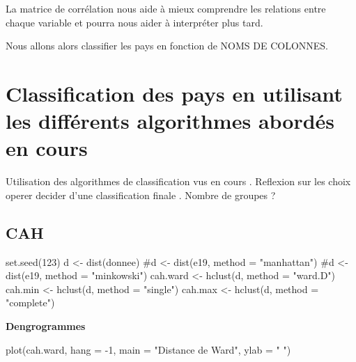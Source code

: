 \documentclass[
]{article}
\newenvironment{Shaded}{}{}
\newcommand{\AttributeTok}[1]{#1}
\newcommand{\CommentTok}[1]{\textcolor[rgb]{0.00,0.50,0.00}{#1}}
\newcommand{\DecValTok}[1]{#1}
\newcommand{\FunctionTok}[1]{#1}
\newcommand{\NormalTok}[1]{#1}
\newcommand{\OtherTok}[1]{\textcolor[rgb]{1.00,0.25,0.00}{#1}}
\newcommand{\SpecialCharTok}[1]{\textcolor[rgb]{0.00,0.50,0.50}{#1}}
\newcommand{\StringTok}[1]{\textcolor[rgb]{0.00,0.50,0.50}{#1}}
\begin{document}
La matrice de corrélation nous aide à mieux comprendre les relations
entre chaque variable et pourra nous aider à interpréter plus tard.

Nous allons alors classifier les pays en fonction de NOMS DE COLONNES.

\hypertarget{classification-des-pays-en-utilisant-les-diffuxe9rents-algorithmes-aborduxe9s-en-cours}{%
\section{Classification des pays en utilisant les différents algorithmes
abordés en
cours}\label{classification-des-pays-en-utilisant-les-diffuxe9rents-algorithmes-aborduxe9s-en-cours}}

Utilisation des algorithmes de classification vus en cours . Reflexion
sur les choix operer decider d'une classification finale . Nombre de
groupes ?

\hypertarget{cah}{%
\subsection{CAH}\label{cah}}

\begin{Shaded}
\begin{Highlighting}[]
\FunctionTok{set.seed}\NormalTok{(}\DecValTok{123}\NormalTok{)}
\NormalTok{d }\OtherTok{\textless{}{-}} \FunctionTok{dist}\NormalTok{(donnee)}
\CommentTok{\#d \textless{}{-} dist(e19, method = "manhattan")}
\CommentTok{\#d \textless{}{-} dist(e19, method = "minkowski")}
\NormalTok{cah.ward }\OtherTok{\textless{}{-}} \FunctionTok{hclust}\NormalTok{(d, }\AttributeTok{method =} \StringTok{"ward.D"}\NormalTok{)}
\NormalTok{cah.min }\OtherTok{\textless{}{-}} \FunctionTok{hclust}\NormalTok{(d, }\AttributeTok{method =} \StringTok{"single"}\NormalTok{)}
\NormalTok{cah.max }\OtherTok{\textless{}{-}} \FunctionTok{hclust}\NormalTok{(d, }\AttributeTok{method =} \StringTok{"complete"}\NormalTok{)}
\end{Highlighting}
\end{Shaded}

\textbf{Dengrogrammes}

\begin{Shaded}
\begin{Highlighting}[]
\FunctionTok{plot}\NormalTok{(cah.ward, }\AttributeTok{hang =} \SpecialCharTok{{-}}\DecValTok{1}\NormalTok{, }\AttributeTok{main =} \StringTok{"Distance de Ward"}\NormalTok{, }\AttributeTok{ylab =} \StringTok{" "}\NormalTok{)}
\end{Highlighting}
\end{Shaded}
\end{document}
